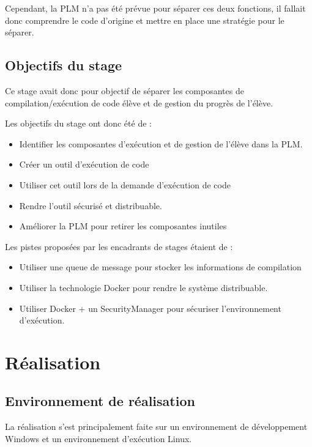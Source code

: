 \documentclass[stage]{tnreport}
\begin{document}
Cependant, la PLM n'a pas été prévue pour séparer ces deux fonctions, il fallait donc comprendre le code d'origine et mettre en place une stratégie pour le séparer.

\section{Objectifs du stage}

Ce stage avait donc pour objectif de séparer les composantes de compilation/exécution de code élève et de gestion du progrès de l'élève.

Les objectifs du stage ont donc été de :
\begin{itemize}
	\item Identifier les composantes d'exécution et de gestion de l'élève dans la PLM.
	\item Créer un outil d'exécution de code
	\item Utiliser cet outil lors de la demande d'exécution de code
	\item Rendre l'outil sécurisé et distribuable.
	\item Améliorer la PLM pour retirer les composantes inutiles
\end{itemize}

Les pistes proposées par les encadrants de stages étaient de :
\begin{itemize}
	\item Utiliser une queue de message pour stocker les informations de compilation
	\item Utiliser la technologie Docker pour rendre le système distribuable.
	\item Utiliser Docker + un SecurityManager pour sécuriser l'environnement d'exécution.
\end{itemize}

\cleardoublepage

\chapter{Réalisation}
\section{Environnement de réalisation}

La réalisation s'est principalement faite sur un environnement de développement Windows et un environnement d'exécution Linux.
\end{document}
